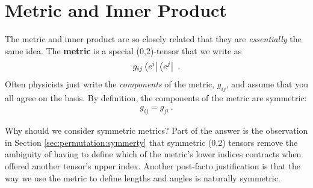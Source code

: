 \documentclass[12pt, oneside]{report}    %
\let\oldsection\section
\def\section{%
  \setcounter{sidenote}{1}%
  \oldsection
}
\begin{document}
\section{Metric and Inner Product}

The metric and inner product are so closely related that they are \emph{essentially} the same idea. The \textbf{metric} is a special (0,2)-tensor that we write as
\begin{align}
    g_{ij}\left\langle e^i\right|\left\langle e^j\right| \ .
\end{align}
Often physicists just write the \emph{components} of the metric, $g_{ij}$, and assume that you all agree on the basis. By definition, the components of the metric are symmetric:
\begin{align}
    g_{ij} = g_{ji} \ .
\end{align}

Why should we consider symmetric metrics? Part of the answer is the observation in Section \ref{sec:permutation:symmerty} that symmetric (0,2) tensors remove the ambiguity of having to define which of the metric's lower indices contracts when offered another tensor's upper index. Another post-facto justification is that the way we use the metric to define lengths and angles is naturally symmetric.
\end{document}
